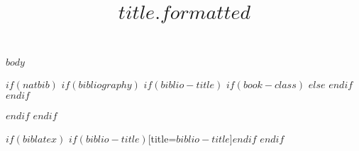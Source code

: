 \documentclass[article$if(classoption)$,$classoption$$endif$]{dp}
\title{$title.formatted$}
\begin{document}
\maketitle
{}

$body$

$if(natbib)$
$if(bibliography)$
$if(biblio-title)$
$if(book-class)$
\renewcommand\bibname{$biblio-title$}
$else$
\renewcommand\refname{$biblio-title$}
$endif$
$endif$

$endif$
$endif$

$if(biblatex)$
\printbibliography$if(biblio-title)$[title=$biblio-title$]$endif$
$endif$
\end{document}

